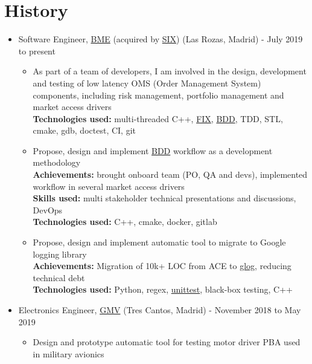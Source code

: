 \documentclass[11pt]{article}
\begin{document}
\section*{History}
\label{sec:orgc6c7474}
\begin{itemize}
\item Software Engineer, \href{https://www.bolsasymercados.es/ing/Home}{BME} (acquired by \href{https://www.six-group.com/en/home.html}{SIX}) (Las Rozas, Madrid) - July 2019 to present\\
\begin{itemize}
\item As part of a team of developers, I am involved in the design, development and testing of low latency OMS (Order Management System) components, including risk management, portfolio management and market access drivers\\
\textbf{Technologies used:} multi-threaded C++, \href{https://www.investopedia.com/terms/f/financial-information-exchange.asp}{FIX}, \href{https://www.agilealliance.org/glossary/bdd/}{BDD}, TDD, STL, cmake, gdb, doctest, CI, git\\
\item Propose, design and implement  \href{https://www.agilealliance.org/glossary/bdd/}{BDD} workflow as a development methodology\\
\textbf{Achievements:} brought onboard team (PO, QA and devs), implemented workflow in several market access drivers\\
\textbf{Skills used:} multi stakeholder technical presentations and discussions, DevOps\\
\textbf{Technologies used:} C++, cmake, docker, gitlab\\
\item Propose, design and implement automatic tool to migrate to Google logging library\\
\textbf{Achievements:} Migration of 10k+ LOC from ACE to \href{https://github.com/google/glog}{glog}, reducing technical debt\\
\textbf{Technologies used:} Python, regex, \href{https://docs.python.org/3/library/unittest.html}{unittest}, black-box testing, C++\\
\end{itemize}
\item Electronics Engineer, \href{https://www.gmv.com/en/}{GMV} (Tres Cantos, Madrid) - November 2018 to May 2019\\
\begin{itemize}
\item Design and prototype automatic tool for testing motor driver PBA used in military avionics\\

\end{itemize}
\end{itemize}
\end{document}
